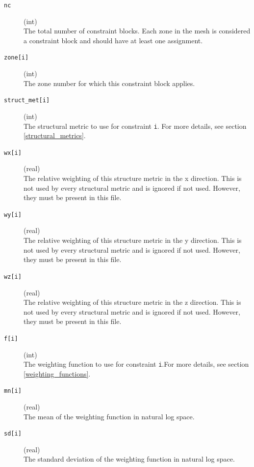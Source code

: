 \documentclass[a4paper,12pt]{article}
\begin{document}
\begin{description}
    \item[\texttt{nc}] (int)\hfill \\
     The total number of constraint blocks. Each zone in the mesh is considered a constraint block and should have at least one assignment.
    
    \item[\texttt{zone[i]}] (int)\hfill \\
     The zone number for which this constraint block applies.
    
    \item[\texttt{struct\_met[i]}] (int)\hfill \\
     The structural metric to use for constraint \texttt{i}. For more details, see section \ref{structural_metrics}.

    \item[\texttt{wx[i]}] (real)\hfill \\
    The relative weighting of this structure metric in the x direction. This is not used by every structural metric and is ignored if not used. However, they must be present in this file.

    \item[\texttt{wy[i]}] (real)\hfill \\
    The relative weighting of this structure metric in the y direction. This is not used by every structural metric and is ignored if not used. However, they must be present in this file.

    \item[\texttt{wz[i]}] (real)\hfill \\
    The relative weighting of this structure metric in the z direction. This is not used by every structural metric and is ignored if not used. However, they must be present in this file.

    \item[\texttt{f[i]}] (int)\hfill \\
     The weighting function to use for constraint \texttt{i}.For more details, see section \ref{weighting_functions}.

    \item[\texttt{mn[i]}] (real)\hfill \\
     The mean of the weighting function in natural log space.

     \item[\texttt{sd[i]}] (real)\hfill \\
     The standard deviation of the weighting function in natural log space.


\end{description}
\end{document}
